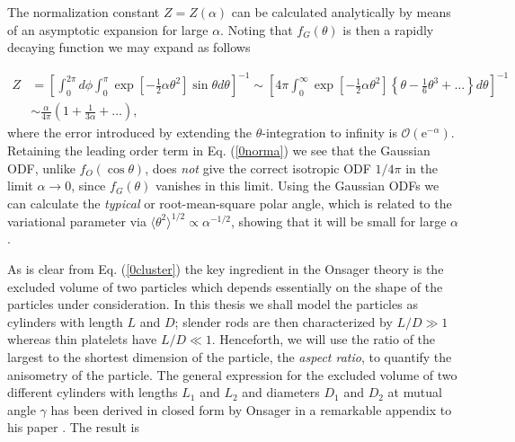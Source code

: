 {The normalization constant $Z=Z(\alpha)$ can be calculated analytically by means of an asymptotic expansion for large $\alpha$. Noting that $f_{G}(\theta)$ is then a rapidly decaying function we may expand as follows

\begin{align}
Z&=\left[\int_{0}^{2\pi} d \phi \int _{0}^{\pi} \exp \left[-\frac{1}{2}\alpha\theta ^{2}\right] \sin\theta d\theta\right]^{-1}
\sim \left[ 4\pi \int _{0}^{\infty} \exp \left[-\frac{1}{2}\alpha\theta ^{2}\right]\left\{ \theta - \frac{1}{6} \theta ^{3}+\ldots \right \}
 d\theta  \right]^{-1} \nonumber \\
&\sim \frac{\alpha}{4\pi}\left(1+\frac{1}{3\alpha}+\ldots \right), \label{0norma}
\end{align}
where the error introduced by extending  the $\theta$-integration  to infinity is $\mathcal{O}(\text{e}^{-\alpha})$. Retaining the leading order term in Eq. (\ref{0norma}) we see that the Gaussian ODF, unlike $f_{O}(\cos\theta)$, does {\em not} give the correct isotropic ODF $1/4\pi$ in the limit $\alpha \rightarrow 0$, since $f_{G}(\theta)$ vanishes in this limit. Using the Gaussian ODFs we can calculate the {\em typical} or root-mean-square polar angle, which is related to the variational parameter via $\langle\theta^{2}\rangle^{1/2}\propto  \alpha^{-1/2}$, showing that it will be small for large $\alpha$.

As is clear from Eq. (\ref{0cluster}) the key ingredient in the Onsager theory is the excluded volume of two particles which depends essentially on the shape of the particles under consideration. In this thesis we shall model the particles as cylinders with length $L$ and $D$; slender rods are then characterized by  $L/D\gg 1$ whereas thin platelets have $L/D\ll 1$. Henceforth, we will use the ratio of the largest to the shortest dimension of the particle, the {\em aspect ratio}, to quantify the anisometry of the particle. The general expression for the excluded volume of two different cylinders with lengths $L_{1}$ and $L_{2}$ and diameters $D_{1}$ and $D_{2}$ at mutual angle $\gamma$ has been derived in closed form by Onsager in a remarkable appendix to his paper \cite{onsager1949}. The result is

}
